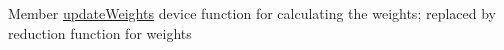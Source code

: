 \label{deprecated__deprecated000001}
\hypertarget{deprecated__deprecated000001}{}
 
\begin{DoxyDescription}
\item[Member \hyperlink{ex__particle__CUDA__float_8cu_a445a6138b006078cfdbd6314ced3ee73}{updateWeights} ]device function for calculating the weights; replaced by reduction function for weights 
\end{DoxyDescription}